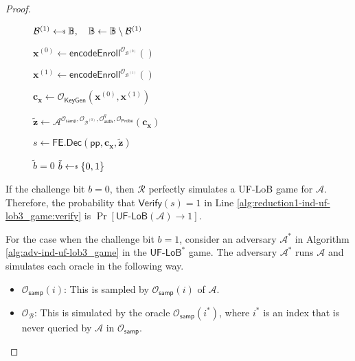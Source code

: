 \begin{proof}
\begin{figure}[h]
\begin{minipage}[t]{0.5\linewidth}
\begin{algorithm}[H]
\begin{algorithmic}[1]
		\State $\mathcal{B}^{(1)} \getsdollar \mathbb{B}, \quad \mathbb{B} \gets \mathbb{B} \setminus \mathcal{B}^{(1)}$

		\State $\mathbf{x}^{(0)} \gets \textsf{encodeEnroll}^{\mathcal{O}_{\mathcal{B}^{(0)}}}()$

		\State $\mathbf{x}^{(1)} \gets \textsf{encodeEnroll}^{\mathcal{O}_{\mathcal{B}^{(1)}}}()$

		\State $\mathbf{c_x} \gets \mathcal{O}_{\textsf{KeyGen}}(\mathbf{x}^{(0)}, \mathbf{x}^{(1)})$

		\State ${\mathbf{\tilde{z}}} \gets \mathcal{A}^{\mathcal{O}_{\textsf{samp}}, \mathcal{O}_{\mathcal{B}^{(0)}}, \mathcal{O}_\textsf{auth}^q, \mathcal{O}_{\textsf{Probe}} } ( \mathbf{c_x})$

		\State $s \gets \textsf{FE.Dec}( \textsf{pp}, \mathbf{c_x}, \mathbf{\tilde{z}} )$

		 \label{alg:reduction1-ind-uf-lob3_game:verify}
			\State \Return $\tilde{b} = 0$
		\Else
			\State \Return $\tilde{b} \getsdollar \{0, 1\}$
		\EndIf

	\end{algorithmic}
	\end{algorithm}
	\end{minipage}
	
\label{fig:reduction1-ind-uf-lob3_game}
\end{figure}

If the challenge bit $b = 0$, then $\mathcal{R}$ perfectly simulates a \textsf{UF-LoB} game for $\mathcal{A}$. Therefore, the probability that $\textsf{Verify}(s) = 1$ in Line \ref{alg:reduction1-ind-uf-lob3_game:verify} is $\Pr[\textsf{UF-LoB}(\mathcal{A}) \to 1]$.

	For the case when the challenge bit $b = 1$, consider an adversary $\mathcal{A}^*$ in Algorithm \ref{alg:adv-ind-uf-lob3_game} in the $\textsf{UF-LoB}^*$ game. The adversary $\mathcal{A}^*$ runs $\mathcal{A}$ and simulates each oracle in the following way.

\begin{itemize}
	\item $\mathcal{O}_{\textsf{samp}}(i)$: This is sampled by $\mathcal{O}_{\textsf{samp}}(i)$ of $\mathcal{A}$.
	
	\item $\mathcal{O}_{\mathcal{B}}$: This is simulated by the oracle $\mathcal{O}_{\textsf{samp}}(i^*)$, where $i^*$ is an index that is never queried by $\mathcal{A}$ in $\mathcal{O}_{\textsf{samp}}$.


\end{itemize}
\end{proof}
